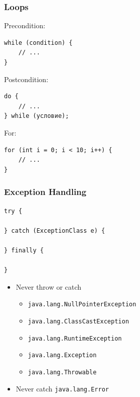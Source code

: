 \documentclass[screen]{beamer}
\begin{document}
\begin{frame}[fragile]
\frametitle{Loops}%
%
Precondition:
\begin{lstlisting}
while (condition) {
    // ...
}
\end{lstlisting}
Postcondition:
\begin{lstlisting}
do {
    // ...
} while (условие);
\end{lstlisting}
For:
\begin{lstlisting}
for (int i = 0; i < 10; i++) {
    // ...
}
\end{lstlisting}
\end{frame}

\begin{frame}[fragile]
\frametitle{Exception Handling}%
\begin{lstlisting}
try {

} catch (ExceptionClass e) {

} finally {

}
\end{lstlisting}

\begin{itemize}
	\item<2-> Never throw or catch
		\begin{itemize}[<3->]
			\item \texttt{java.lang.NullPointerException}
			\item \texttt{java.lang.ClassCastException}
			\item \texttt{java.lang.RuntimeException}
			\item \texttt{java.lang.Exception}
			\item \texttt{java.lang.Throwable}
		\end{itemize}
	\item<4-> Never catch \texttt{java.lang.Error}
\end{itemize}
\end{frame}
\end{document}
